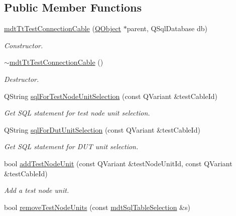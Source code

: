 \subsection*{Public Member Functions}
\begin{DoxyCompactItemize}
\item 
\hyperlink{classmdt_tt_test_connection_cable_aac7d5778e8a91d9cd2f5aa3c537cf879}{mdt\-Tt\-Test\-Connection\-Cable} (\hyperlink{class_q_object}{Q\-Object} $\ast$parent, Q\-Sql\-Database db)
\begin{DoxyCompactList}\small\item\em Constructor. \end{DoxyCompactList}\item 
\hyperlink{classmdt_tt_test_connection_cable_acca8a9ed0ac97e056d4917c7fa077609}{$\sim$mdt\-Tt\-Test\-Connection\-Cable} ()
\begin{DoxyCompactList}\small\item\em Destructor. \end{DoxyCompactList}\item 
Q\-String \hyperlink{classmdt_tt_test_connection_cable_a24a9da7f6b48097d5f1dee660d175cfd}{sql\-For\-Test\-Node\-Unit\-Selection} (const Q\-Variant \&test\-Cable\-Id)
\begin{DoxyCompactList}\small\item\em Get S\-Q\-L statement for test node unit selection. \end{DoxyCompactList}\item 
Q\-String \hyperlink{classmdt_tt_test_connection_cable_af3bc25739b94c05bb845a2f10775f19d}{sql\-For\-Dut\-Unit\-Selection} (const Q\-Variant \&test\-Cable\-Id)
\begin{DoxyCompactList}\small\item\em Get S\-Q\-L statement for D\-U\-T unit selection. \end{DoxyCompactList}\item 
bool \hyperlink{classmdt_tt_test_connection_cable_a39fed62a746a20313b121caf9141b503}{add\-Test\-Node\-Unit} (const Q\-Variant \&test\-Node\-Unit\-Id, const Q\-Variant \&test\-Cable\-Id)
\begin{DoxyCompactList}\small\item\em Add a test node unit. \end{DoxyCompactList}\item 
bool \hyperlink{classmdt_tt_test_connection_cable_a98885f0ce4d43bdc3866b13c53744913}{remove\-Test\-Node\-Units} (const \hyperlink{classmdt_sql_table_selection}{mdt\-Sql\-Table\-Selection} \&s)

\end{DoxyCompactItemize}
